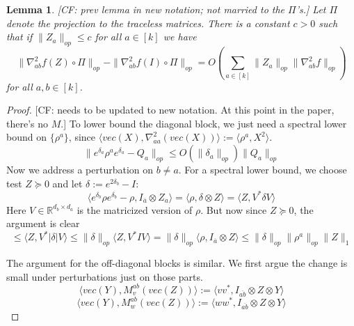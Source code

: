 \documentclass{article}
\newtheorem{lemma}[theorem]{Lemma}
\newcommand{\R}{{\mathbb{R}}}
\newcommand{\CF}[1]{{\color{purple}[CF: #1]}}
\begin{document}
\begin{lemma}\label{lem:block-perturbation}\CF{prev lemma in new notation; not married to the $\Pi$'s.} Let $\Pi$ denote the projection to the traceless matrices. There is a constant $c>0$ such that if $\|Z_a\|_{op} \leq c $ for all $a \in [k]$ we have
$$\|\nabla^2_{ab} f(Z) \circ \Pi\|_{op} - \|\nabla^2_{ab}f(I)  \circ \Pi \|_{op}  = O\left( \sum_{a \in [k]} \|Z_a\|_{op} \|\nabla^2_{ab}f\|_{op}\right)$$
for all $a,b \in [k]$.

\end{lemma}
\begin{proof}\CF{needs to be updated to new notation. At this point in the paper, there's no $M$.}
To lower bound the diagonal block, we just need a spectral lower bound on $\{\rho^{a}\}$, since $\langle vec(X), \nabla_{aa}^{2} (vec(X)) \rangle := \langle \rho^{a}, X^{2} \rangle$.
\[ \| e^{\delta_{a}} \rho^{a} e^{\delta_{a}} - Q_{a}\|_{op} \leq O(\|\delta_{a}\|_{op}) \|Q_{a}\|_{op}   \]
Now we address a perturbation on $b \neq a$. For a spectral lower bound, we choose test $Z \succeq 0$ and let $\delta := e^{2\delta_{b}} - I$:
\[ \langle e^{\delta_{b}} \rho e^{\delta_{b}} - \rho, I_{\overline{a}} \otimes Z_{a} \rangle
= \langle \rho, \delta \otimes Z \rangle = \langle Z, V^{*} \delta V \rangle   \]
Here $V \in \R^{d_{b} \times d_{a}}$ is the matricized version of $\rho$. But now since $Z \succeq 0$, the argument is clear
\[ \leq \langle Z, V^{*} |\delta| V \rangle \leq \|\delta\|_{op} \langle Z, V^{*} I V \rangle = \|\delta\|_{op} \langle \rho, I_{\overline{a}} \otimes Z \rangle \leq \|\delta\|_{op} \|\rho^{a}\|_{op} \|Z\|_{1}    \]

The argument for the off-diagonal blocks is similar. We first argue the change is small under perturbations just on those parts. 
\[ \langle vec(Y), M_{v}^{ab}(vec(Z)) \rangle := \langle v v^{*}, I_{\overline{ab}} \otimes Z \otimes Y \rangle \]
\[ \langle vec(Y), M_{w}^{ab}(vec(Z)) \rangle := \langle w w^{*}, I_{\overline{ab}} \otimes Z \otimes Y \rangle\]


\end{proof}
\end{document}
